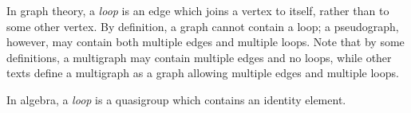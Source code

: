 \documentclass{article}
\begin{document}
In graph theory, a \emph{loop} is an edge which joins a vertex
to itself, rather than to some other vertex. By definition,
a graph cannot contain a loop; a pseudograph, however, may contain
both multiple edges and multiple loops. Note that by some definitions,
a multigraph may contain multiple edges and no loops, while other texts
define a multigraph as a graph
allowing multiple edges and multiple loops.

In algebra, a \emph{loop} is a quasigroup which contains an identity element.
\end{document}

